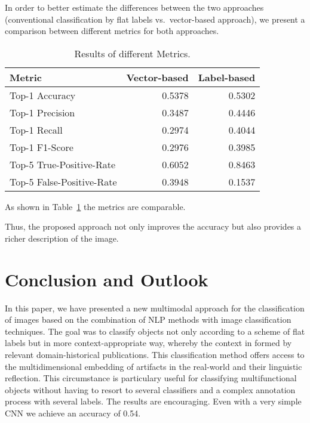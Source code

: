 In order to better estimate the differences between the two approaches (conventional classification by flat labels vs.~vector-based approach), we present a comparison between different metrics for both approaches.

\begin{table}
    \centering
    \begin{tabular}{lrr}
    	\toprule
    	Metric                     &   Vector-based &   Label-based \\ \midrule
    	Top-1 Accuracy             &   \num{0.5378} &  \num{0.5302} \\
    	Top-1 Precision            &   \num{0.3487} &  \num{0.4446} \\
    	Top-1 Recall               &   \num{0.2974} &  \num{0.4044} \\
    	Top-1 F1-Score             &   \num{0.2976} &  \num{0.3985} \\ \midrule
    	Top-5 True-Positive-Rate   &   \num{0.6052} &  \num{0.8463} \\
    	Top-5 False-Positive-Rate  &   \num{0.3948} &  \num{0.1537} \\
         \bottomrule
    \end{tabular}
    \caption{Results of different Metrics.}
    \label{tab:results}
\end{table}

As shown in Table~\ref{tab:results} the metrics are comparable.


Thus, the proposed approach not only improves the accuracy but also provides a richer description of the image.


\section{Conclusion and Outlook}
In this paper, we have presented a new multimodal approach for the classification of images based on the combination of NLP methods with image classification techniques. The goal was to classify objects not only according to a scheme of flat labels but in more context-appropriate way, whereby the context in formed by relevant domain-historical publications. This classification method offers access to the multidimensional embedding of artifacts in the real-world and their linguistic reflection. This circumstance is particulary useful for classifying multifunctional objects without having to resort to several classifiers and a complex annotation process with several labels. The results are encouraging. Even with a very simple CNN we achieve an accuracy of \num{0.54}.


